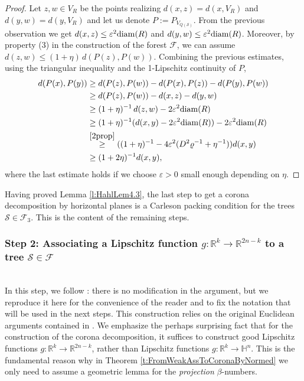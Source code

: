 \documentclass[12pt]{amsart}
\newcommand{\diam}{{\rm diam}}
\renewcommand{\rho}{\varrho}
\renewcommand{\epsilon}{\varepsilon}
\numberwithin{equation}{section}
\theoremstyle{plain}
\theoremstyle{definition}
\theoremstyle{remark}
\begin{document}
\begin{proof}
    Let $z,w\in V_R$ be the points realizing $d(x,z)=d(x,V_R)$ and $d(y,w)=d(y,V_R)$ and let us  denote $P:=P_{V_{Q(\mathcal S)}}$. From the previous observation we get $d(x,z)\leq \varepsilon^2 \diam(R)$ and $d(y,w)\leq \varepsilon^2 \diam(R)$. Moreover, by property (3) in the construction of the forest $\mathcal F$, we can assume $d(z,w)\leq (1+\eta)\,d(P(z),P(w))$.
    Combining the previous estimates, using the triangular inequality and the 1-Lipschitz continuity of $P$,
    \[\begin{split}d(P(x),P(y))&\geq d(P(z),P(w))-d(P(x),P(z))-d(P(y),P(w))\\ &\geq d(P(z),P(w))-d(x,z)-d(y,w) \\ &\geq (1+\eta)^{-1}\,d(z,w)-2\varepsilon^2 \diam(R)\\ &\geq (1+\eta)^{-1}(d(x,y)-2\varepsilon^2 \diam(R))-2\varepsilon^2 \diam(R)\\&\stackrel{\eqref{2prop}}\geq((1+\eta)^{-1}-4\varepsilon^2(D^2\rho^{-1}+\eta^{-1}))d(x,y)\\ &\geq (1+2\eta)^{-1}d(x,y),\end{split}\]
    where the last estimate holds if we choose $\varepsilon>0$ small enough depending on $\eta$.
\end{proof}
Having proved Lemma \ref{l:HahlLem4.3}, the last step to get a corona decomposition by horizontal planes is a Carleson packing condition for the trees $\mathcal S\in\mathcal F_3$. This is the content of the remaining steps.


\subsubsection{Step 2: Associating a Lipschitz function  $g:\mathbb{R}^k \to \mathbb{R}^{2n-k}$ to a tree $\mathcal{S}\in \mathcal{F}$}\label{sss:Step 2}
\phantom{}\vspace{0.1cm}\\
In this step, we follow \cite[Section 5]{Hahlomaa}: there is no modification in the argument, but we reproduce it here for the convenience of the reader and to fix the notation that will be used in the next steps. This construction relies on the original Euclidean arguments contained in \cite[Section 8]{David1}. We emphasize the perhaps surprising fact that for the construction of the corona decomposition, it suffices to construct good Lipschitz functions $g: \mathbb{R}^k \to \mathbb{R}^{2n-k}$, rather than Lipschitz functions $g:\mathbb{R}^k \to \mathbb{H}^n$. This is the fundamental reason why in Theorem \ref{t:FromWeakAssToCoronaByNormed} we only need to assume a geometric lemma for the \emph{projection} $\beta$-numbers.
\end{document}
